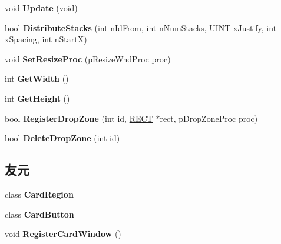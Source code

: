 \begin{DoxyCompactItemize}
\hyperlink{interfacevoid}{void} {\bfseries Update} (\hyperlink{interfacevoid}{void})
\item 
\mbox{\label{class_card_window_a0236e05aa2e2d58075d5429aee59f869}} 
bool {\bfseries Distribute\+Stacks} (int n\+Id\+From, int n\+Num\+Stacks, U\+I\+NT x\+Justify, int x\+Spacing, int n\+StartX)
\item 
\mbox{\label{class_card_window_a105279d6ffe8888828f14d01835ef413}} 
\hyperlink{interfacevoid}{void} {\bfseries Set\+Resize\+Proc} (p\+Resize\+Wnd\+Proc proc)
\item 
\mbox{\label{class_card_window_a3b1f503dac2b73229ff1b65f6037c531}} 
int {\bfseries Get\+Width} ()
\item 
\mbox{\label{class_card_window_a0a2a10874141864181a584b5dab54d82}} 
int {\bfseries Get\+Height} ()
\item 
\mbox{\label{class_card_window_aacb0db5922050d0da8e7136538df1cbf}} 
bool {\bfseries Register\+Drop\+Zone} (int id, \hyperlink{structtag_r_e_c_t}{R\+E\+CT} $\ast$rect, p\+Drop\+Zone\+Proc proc)
\item 
\mbox{\label{class_card_window_a1710821052b95a7b3ff048551ce67d67}} 
bool {\bfseries Delete\+Drop\+Zone} (int id)
\end{DoxyCompactItemize}
\subsection*{友元}
\begin{DoxyCompactItemize}
\item 
\mbox{\label{class_card_window_a4c254036246a74e6cf000397ce876c4f}} 
class {\bfseries Card\+Region}
\item 
\mbox{\label{class_card_window_a1a863f586ce57edc6019a8adab28d833}} 
class {\bfseries Card\+Button}
\item 
\mbox{\label{class_card_window_ab8914c3a241107ea699edf7d39df4392}} 
\hyperlink{interfacevoid}{void} {\bfseries Register\+Card\+Window} ()
\end{DoxyCompactItemize}


